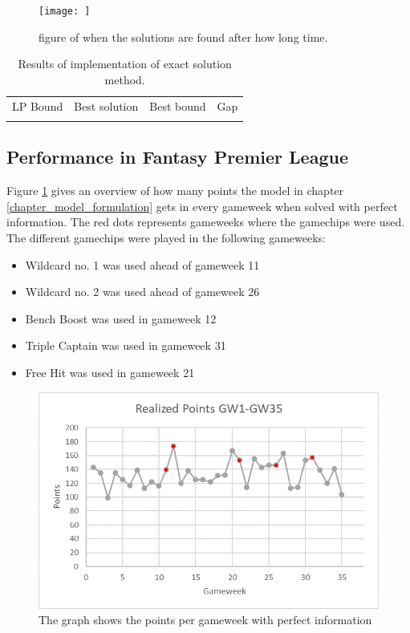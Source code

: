 \begin{figure}[H]
    \centering
    \texttt{[image: ]}
    \caption{figure of when the solutions are found after how long time.}
\end{figure}

\begin{table}[H]
    \centering
    \caption{Results of implementation of exact solution method.}
    \begin{tabular}{c|c|c|c}
        LP Bound & Best solution & Best bound & Gap  \\
         & &
    \end{tabular}
\end{table}


\subsection{Performance in Fantasy Premier League}
Figure \ref{Figure_Realized_points} gives an overview of how many points the model in chapter \ref{chapter_model_formulation} gets in every gameweek when solved with perfect information. The red dots represents gameweeks where the gamechips were used. The different gamechips were played in the following gameweeks: 

\begin{itemize}
    \item Wildcard no. 1 was used ahead of gameweek 11
    \item Wildcard no. 2 was used ahead of gameweek 26
    \item Bench Boost  was used in gameweek 12 
    \item Triple Captain was used in gameweek 31
    \item Free Hit was used in gameweek 21 
\end{itemize}

\begin{figure}[H]
\label{fig:Realized_points}
    \centering
    \includegraphics[scale=0.75]{fig/chapter_7/RealizedPoints.png}
    \caption{The graph shows the points per gameweek with perfect information}
\label{Figure_Realized_points}    
\end{figure}

